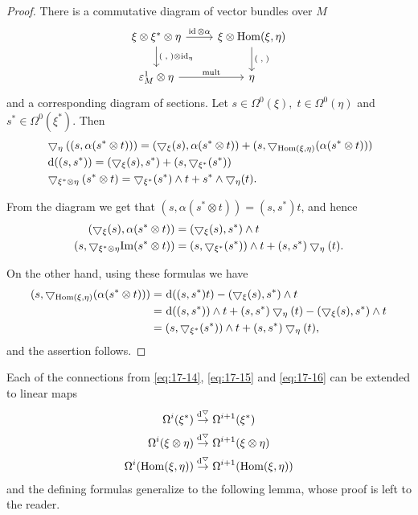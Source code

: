 \begin{proof}
  There is a commutative diagram of vector bundles over $M$
  \[\begin{tikzcd}
    \xi\otimes\xi^*\otimes\eta\dar{(\;,\;)\otimes\id_\eta}\rar{\id\otimes\alpha} & \xi\otimes\hom(\xi, \eta)\dar{(\;,\;)}\\
    \varepsilon_M^1\otimes\eta\rar{\text{mult}} & \eta
  \end{tikzcd}\]
  and a corresponding diagram of sections. Let $s \in  \Omega^0(\xi),\;t \in  \Omega^0( \eta )$ 
  and $s^* \in  \Omega^0( \xi^*)$. Then
  \begin{align*}
    & \btd_{\eta }(( {s,\alpha ( {s^* \otimes  t}) }) ) 
      = ( {\btd_{\xi }(s),\alpha ( {s^* \otimes  t}) })  
      + ( {s,\btd_{\hom( \xi, \eta) }( {\alpha ( {s^* \otimes  t}) }) }) \\
    & \dd( ( {s,s^*}) )  = ( {\btd_{\xi }(s),s^*}) 
      + ( {s,\btd_{\xi^*}( s^*) }) \\
    & \btd_{\xi^* \otimes  \eta }( {s^* \otimes  t}) 
      = \btd_{\xi^*}( s^*)  \land  t 
      + s^* \land  \btd_{\eta }(t).
  \end{align*}

  From the diagram we get that $( {s,\alpha ( {s^* \otimes  t}) })  = ( {s,s^*}) t$, and hence
  \begin{align*}
    ( {\bigtriangledown_{\xi }(s),\alpha ( {s^* \otimes  t}) }) 
      & = ( {\bigtriangledown_{\xi }(s),s^*})  \land  t \\  
    ( {s,\bigtriangledown_{\xi^* \otimes  \eta }\mathrm{Im}( {s^* \otimes  t}) })  
      & = ( {s,\bigtriangledown_{\xi^*}( s^*) })  \land  t + ( {s,s^*}) \bigtriangledown_{\eta }(t).
  \end{align*}

  On the other hand, using these formulas we have
  \begin{align*}
    ( {s,\btd_{\hom( \xi, \eta) }( {\alpha ( {s^* \otimes  t}) }) })  
    & = \!\dd( {( {s,s^*}) t}) - ( {\btd_{\xi }(s),s^*})  \land  t \\
    & = \!\dd( ( {s,s^*}) )  \land  t + ( {s,s^*}) \btd_{\eta }(t) - ( {\btd_{\xi }(s),s^*})  \land  t \\
    & = ( {s,\btd_{\xi^*}( s^*) })  \land  t + ( {s,s^*}) \btd_{\eta }(t),
  \end{align*}
  and the assertion follows.
\end{proof}

Each of the connections from \eqref{eq:17-14}, \eqref{eq:17-15} and \eqref{eq:17-16} can 
be extended to linear maps
\begin{align*}
  \Omega^{i}( \xi^*) & \overset{\dd^\btd}{ \ra  }\Omega^{i + 1}( \xi^*)\\
  \Omega^{i}( {\xi  \otimes  \eta }) & \overset{\dd^\btd}{ \ra  }\Omega^{i + 1}( {\xi  \otimes  \eta })\\
  \Omega^{i}(\hom(\xi,\eta)) & \overset{\dd^\btd}{ \ra  }\Omega^{i + 1}( {\hom( \xi, \eta) })
\end{align*}
and the defining formulas generalize to the following lemma, whose proof is left to the reader.

